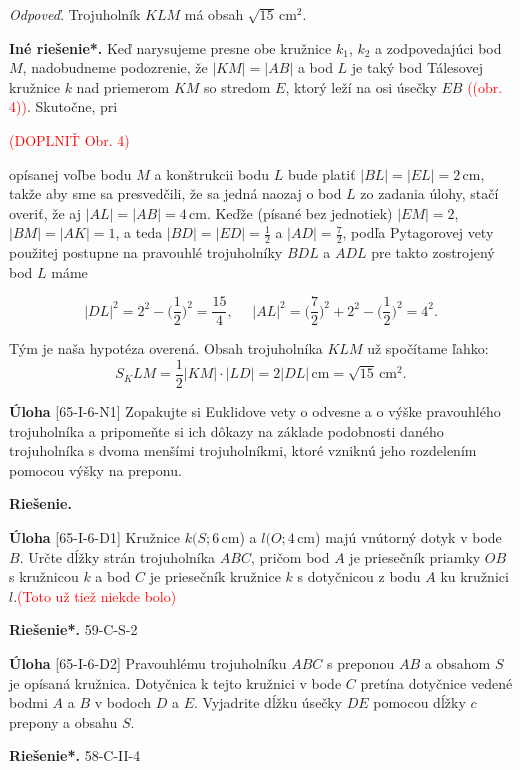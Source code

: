 \documentclass{article}
\newcommand{\rie}{\textbf{Riešenie.} }
\newcommand{\rieh}{\textbf{Riešenie*.} }
\newcommand\todo[1]{\noindent\textcolor{red}{(#1)}}
\newcommand{\problem}[3]{
  \begin{tcolorbox}[breakable,notitle,boxrule=0pt,colback=light-gray,colframe=light-gray]
    \textbf{Úloha}
    [#1] #2
  \end{tcolorbox}
  \noindent#3
}
\begin{document}
{\textit{Odpoveď.} Trojuholník $KLM$ má obsah $\sqrt{15}$\,cm$^2$.

\textbf{Iné riešenie*.} Keď narysujeme presne obe kružnice $k_1$, $k_2$ a zodpovedajúci bod $M$, nadobudneme podozrenie, že $|KM| = |AB|$ a bod $L$ je taký bod Tálesovej kružnice $k$ nad priemerom $KM$ so stredom $E$, ktorý leží na osi úsečky $EB$ \todo{(obr. 4)}. Skutočne, pri

\todo{DOPLNIŤ Obr. 4}

opísanej voľbe bodu $M$ a konštrukcii bodu $L$ bude platiť $|BL| = |EL| = 2$\,cm, takže aby sme sa presvedčili, že sa jedná naozaj o bod $L$ zo zadania úlohy, stačí overiť, že aj $|AL| = |AB| = 4$\,cm. Keďže (písané bez jednotiek) $|EM| = 2$, $|BM| = |AK| = 1$, a teda $|BD| = |ED| =\frac{1}{2}$ a $|AD| =\frac{7}{2}$, podľa Pytagorovej vety použitej postupne na pravouhlé trojuholníky $BDL$ a $ADL$ pre takto zostrojený bod $L$ máme

$$|DL|^2 = 2^2 - \bigg( \frac{1}{2}\bigg)^2=\frac{15}{4}, \ \ \ \ \ \ |AL|^2=\bigg(\frac{7}{2}\bigg)^2+ 2^2 - \bigg(\frac{1}{2}\bigg)^2= 4^2.$$

Tým je naša hypotéza overená. Obsah trojuholníka $KLM$ už spočítame ľahko:
$$S_KLM =\frac{1}{2}|KM| \cdot |LD| = 2|DL|\,\text{cm} =\sqrt{15}\,\text{cm}^2.$$
}



\problem{65-I-6-N1}{
Zopakujte si Euklidove vety o odvesne a o výške pravouhlého trojuholníka a pripomeňte si ich dôkazy na základe podobnosti daného trojuholníka s dvoma menšími trojuholníkmi, ktoré vzniknú jeho rozdelením pomocou výšky na preponu.
}{
\rie 
}


\problem{65-I-6-D1}{
Kružnice $k(S; 6$\,cm) a $l(O; 4$\,cm) majú vnútorný dotyk v bode $B$. Určte dĺžky strán trojuholníka $ABC$, pričom bod $A$ je priesečník priamky $OB$ s kružnicou $k$ a bod $C$ je priesečník kružnice $k$ s dotyčnicou z bodu $A$ ku kružnici $l$.\todo{Toto už tiež niekde bolo}
}{
\rieh 59-C-S-2
}


\problem{65-I-6-D2}{
Pravouhlému trojuholníku $ABC$ s preponou $AB$ a obsahom $S$ je opísaná kružnica. Dotyčnica k tejto kružnici v bode $C$ pretína dotyčnice vedené bodmi $A$ a $B$ v bodoch $D$ a $E$. Vyjadrite dĺžku úsečky $DE$ pomocou dĺžky $c$ prepony a obsahu $S$.
}{
\rieh 58-C-II-4
}
\end{document}

